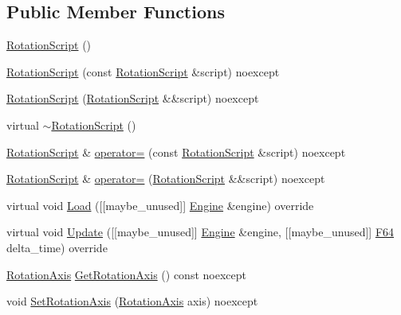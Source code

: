 \subsection*{Public Member Functions}
\begin{DoxyCompactItemize}
\item 
\hyperlink{classmage_1_1script_1_1_rotation_script_a2961e96c890f5b737fa1851a4f6434fe}{Rotation\+Script} ()
\item 
\hyperlink{classmage_1_1script_1_1_rotation_script_adac08b8383fabba67df915f03a2a01ee}{Rotation\+Script} (const \hyperlink{classmage_1_1script_1_1_rotation_script}{Rotation\+Script} \&script) noexcept
\item 
\hyperlink{classmage_1_1script_1_1_rotation_script_a56942de038a4899fa2fb3d9199f18052}{Rotation\+Script} (\hyperlink{classmage_1_1script_1_1_rotation_script}{Rotation\+Script} \&\&script) noexcept
\item 
virtual \hyperlink{classmage_1_1script_1_1_rotation_script_a7deb74070c49b78b0b91e3599ee8a0b7}{$\sim$\+Rotation\+Script} ()
\item 
\hyperlink{classmage_1_1script_1_1_rotation_script}{Rotation\+Script} \& \hyperlink{classmage_1_1script_1_1_rotation_script_a9302878671d095bab0c31a379ad7d964}{operator=} (const \hyperlink{classmage_1_1script_1_1_rotation_script}{Rotation\+Script} \&script) noexcept
\item 
\hyperlink{classmage_1_1script_1_1_rotation_script}{Rotation\+Script} \& \hyperlink{classmage_1_1script_1_1_rotation_script_af75323393f7570b9fcee0cd62c4f76bd}{operator=} (\hyperlink{classmage_1_1script_1_1_rotation_script}{Rotation\+Script} \&\&script) noexcept
\item 
virtual void \hyperlink{classmage_1_1script_1_1_rotation_script_a7da4165e899facc981c0ee5b1f4a4453}{Load} (\mbox{[}\mbox{[}maybe\+\_\+unused\mbox{]}\mbox{]} \hyperlink{classmage_1_1_engine}{Engine} \&engine) override
\item 
virtual void \hyperlink{classmage_1_1script_1_1_rotation_script_a80bf028bec300a71d016fd513233ba03}{Update} (\mbox{[}\mbox{[}maybe\+\_\+unused\mbox{]}\mbox{]} \hyperlink{classmage_1_1_engine}{Engine} \&engine, \mbox{[}\mbox{[}maybe\+\_\+unused\mbox{]}\mbox{]} \hyperlink{namespacemage_ad26233bbec640deda836e572c1a23708}{F64} delta\+\_\+time) override
\item 
\hyperlink{classmage_1_1script_1_1_rotation_script_a54e1d1d0af65f43f5bc5ad65a4b9c00a}{Rotation\+Axis} \hyperlink{classmage_1_1script_1_1_rotation_script_ac2ef46249d59b379f47336eb250f3a28}{Get\+Rotation\+Axis} () const noexcept
\item 
void \hyperlink{classmage_1_1script_1_1_rotation_script_aa4b49dc5e34da3e851d5aefc4c4a434b}{Set\+Rotation\+Axis} (\hyperlink{classmage_1_1script_1_1_rotation_script_a54e1d1d0af65f43f5bc5ad65a4b9c00a}{Rotation\+Axis} axis) noexcept
\end{DoxyCompactItemize}
